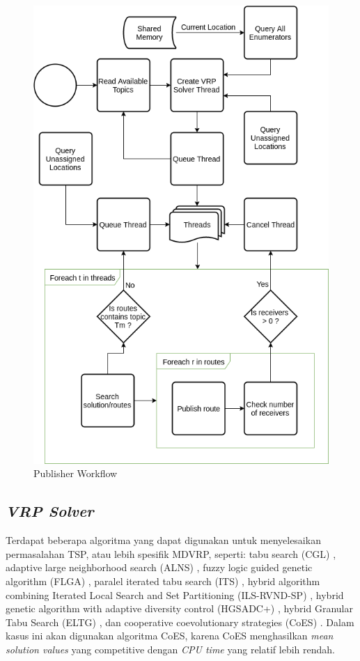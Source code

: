 \begin{figure}[!]
	\centering
	\includegraphics[width=12cm]{Resources/Images/publisher-algorithm}
	\caption{Publisher Workflow}
	\label{fig:publisher-algorithm}
\end{figure}


\subsection{\textit{VRP Solver}}
\label{ssec:vrp-solver}
Terdapat beberapa algoritma yang dapat digunakan untuk menyelesaikan permasalahan TSP, atau lebih spesifik MDVRP, seperti: tabu search (CGL) \citep{cordeau_tabu_1997}, adaptive large neighborhood search (ALNS) \citep{pisinger_general_2007}, fuzzy logic guided genetic algorithm (FLGA) \citep{lau_application_2010}, paralel iterated tabu search (ITS) \citep{cordeau_parallel_2012}, hybrid algorithm combining Iterated Local Search and Set Partitioning (ILS-RVND-SP) \citep{subramanian_hybrid_2013}, hybrid genetic algorithm with adaptive diversity control (HGSADC+) \citep{vidal_implicit_2014}, hybrid Granular Tabu Search (ELTG) \citep{escobar_hybrid_2014}, dan cooperative coevolutionary strategies (CoES) \citep{de_oliveira_cooperative_2016}. Dalam kasus ini akan digunakan algoritma CoES, karena CoES menghasilkan \textit{mean solution values} yang competitive dengan \textit{CPU time} yang relatif lebih rendah.


